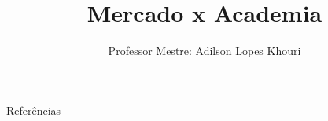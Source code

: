 \documentclass[compress, hyperref={pdfpagelayout=SinglePage}]{beamer}
\title[TCC II - Aula 02]{Mercado x Academia}
\author{Professor Mestre: Adilson Lopes Khouri}
\begin{document}
	\begin{frame}
		\titlepage
	\end{frame}
	
	
	
	
	
	
	
	
	
	
					
	

	

	\begin{frame}[allowframebreaks]{}
		\begin{block}{Referências}
			\tiny
			\nocite{*}
			
	    		
	    	\end{block}
	\end{frame}
\end{document}
